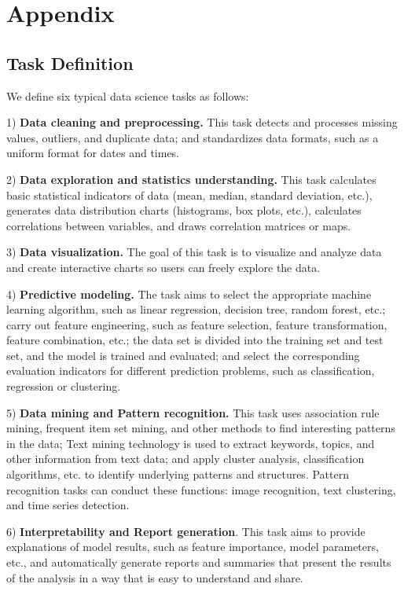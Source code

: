 \section{Appendix}
\label{sec: appendix}

\subsection{Task Definition}
\label{ssec: task_des}
We define six typical data science tasks as follows:

1) \textbf{Data cleaning and preprocessing.} This task detects and processes missing values, outliers, and duplicate data; and standardizes data formats, such as a uniform format for dates and times.
    
2) \textbf{Data exploration and statistics understanding.} This task calculates basic statistical indicators of data (mean, median, standard deviation, etc.), generates data distribution charts (histograms, box plots, etc.), calculates correlations between variables, and draws correlation matrices or maps. 
    
3) \textbf{Data visualization.} The goal of this task is to visualize and analyze data and create interactive charts so users can freely explore the data.
    
4) \textbf{Predictive modeling.} The task aims to select the appropriate machine learning algorithm, such as linear regression, decision tree, random forest, etc.; carry out feature engineering, such as feature selection, feature transformation, feature combination, etc.; the data set is divided into the training set and test set, and the model is trained and evaluated; and select the corresponding evaluation indicators for different prediction problems, such as classification, regression or clustering. 
    
5) \textbf{Data mining and Pattern recognition.} This task uses association rule mining, frequent item set mining, and other methods to find interesting patterns in the data; Text mining technology is used to extract keywords, topics, and other information from text data; and apply cluster analysis, classification algorithms, etc. to identify underlying patterns and structures. 
Pattern recognition tasks can conduct these functions: image recognition, text clustering, and time series detection.
    
6) \textbf{Interpretability and Report generation}. This task aims to provide explanations of model results, such as feature importance, model parameters, etc., and automatically generate reports and summaries that present the results of the analysis in a way that is easy to understand and share. 


